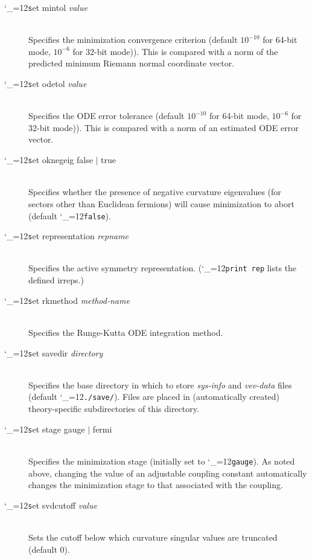 \documentclass [12pt]{article}
\makeatletter
\renewcommand{\tt}{\begingroup\catcode`_=12\def\_{\string_}\tt@}
\newcommand{\tt@}[1]{\texttt{#1}\endgroup}
\makeatother
\begin{document}
\begin{description}
\item [\tt set mintol {\it value}]~\\
    Specifies the minimization convergence criterion
    (default $10^{-10}$ for 64-bit mode,
    $10^{-6}$ for 32-bit mode)).
    This is compared with a norm of the
    predicted minimum Riemann normal
    coordinate vector.

\item [\tt set odetol {\it value}]~\\
    Specifies the ODE error tolerance
    (default $10^{-10}$ for 64-bit mode,
    $10^{-6}$ for 32-bit mode)).
    This is compared with a norm of an estimated
    ODE error vector.

\item [\tt set oknegeig false $\vert$ true]~\\
    Specifies whether the presence of negative
    curvature eigenvalues (for sectors other than 
    Euclidean fermions) will cause minimization to abort
    (default \tt{false}).

\item [\tt set representation {\it repname}]~\\
    Specifies the active symmetry representation.
    (\tt{print rep} lists the defined irreps.)

\item [\tt set rkmethod {\it method-name}]~\\
    Specifies the Runge-Kutta ODE integration method.

\item [\tt set savedir {\it directory}]~\\
    Specifies the base directory in which to store
    \textit{sys-info} and \textit{vev-data}
    files (default \tt{./save/}).
    Files are placed in (automatically created)
    theory-specific subdirectories of this directory.

\item [\tt set stage gauge $\vert$ fermi]~\\
    Specifies the minimization stage
    (initially set to \tt{gauge}).
    As noted above,
    changing the value of an adjustable coupling constant
    automatically changes the minimization stage to that
    associated with the coupling.

\item [\tt set svdcutoff {\it value}]~\\
    Sets the cutoff below which
    curvature singular values are truncated
    (default $0$).


\end{description}
\end{document}
